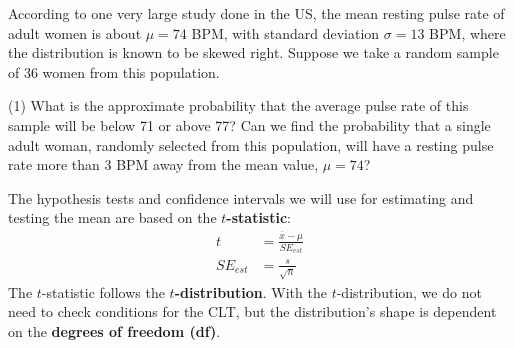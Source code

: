 \documentclass[../mathNotesPreamble]{subfiles}
\begin{document}
  \begin{ex*}
    According to one very large study done in the US, the mean resting pulse rate of adult women is about $\mu=74$ BPM, with standard deviation $\sigma=13$ BPM, where the distribution is known to be skewed right. Suppose we take a random sample of 36 women from this population.
  \end{ex*}
  \begin{extasks}[after-item-skip=\stretch{1}](1)
    \task What is the approximate probability that the average pulse rate of this sample will be below 71 or above 77?
    \task Can we find the probability that a single adult woman, randomly selected from this population, will have a resting pulse rate more than 3 BPM away from the mean value, $\mu=74$?
  \end{extasks}
  \pagebreak
  
  \begin{defn*}
    The hypothesis tests and confidence intervals we will use for estimating and testing the mean are based on the \textbf{$t$-statistic}:
    \begin{align*}
      t&=\frac{\overline{x}-\mu}{SE_{est}}\\[5pt]
      SE_{est}&=\frac{s}{\sqrt{n}}
    \end{align*}
    The $t$-statistic follows the \textbf{$t$-distribution}. With the $t$-distribution, we do not need to check conditions for the CLT, but the distribution's shape is dependent on the \textbf{degrees of freedom (df)}.
  \end{defn*}
  \vspace*{1\baselineskip}
  
  \begin{center}
  \end{center}

  \pagebreak
\end{document}
